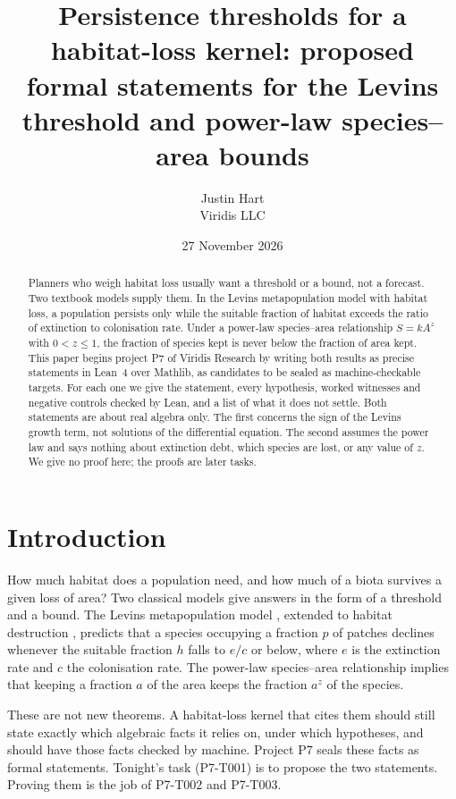 \documentclass[11pt]{article}
\title{Persistence thresholds for a habitat-loss kernel: proposed formal statements for the Levins
threshold and power-law species--area bounds}
\author{Justin Hart\\Viridis LLC}
\date{27 November 2026}
\begin{document}
\maketitle

\begin{abstract}
Planners who weigh habitat loss usually want a threshold or a bound, not a forecast. Two textbook
models supply them. In the Levins metapopulation model with habitat loss, a population persists
only while the suitable fraction of habitat exceeds the ratio of extinction to colonisation rate.
Under a power-law species--area relationship $S=kA^z$ with $0<z\le1$, the fraction of species kept
is never below the fraction of area kept. This paper begins project P7 of Viridis Research by
writing both results as precise statements in Lean~4 over Mathlib, as candidates to be sealed as
machine-checkable targets. For each one we give the statement, every hypothesis, worked witnesses
and negative controls checked by Lean, and a list of what it does not settle. Both statements are
about real algebra only. The first concerns the sign of the Levins growth term, not solutions of
the differential equation. The second assumes the power law and says nothing about extinction
debt, which species are lost, or any value of $z$. We give no proof here; the proofs are later
tasks.
\end{abstract}

\section{Introduction}
How much habitat does a population need, and how much of a biota survives a given loss of area?
Two classical models give answers in the form of a threshold and a bound. The Levins
metapopulation model \citep{Levins1969}, extended to habitat destruction
\citep{Lande1987,NeeMay1992}, predicts that a species occupying a fraction $p$ of patches declines
whenever the suitable fraction $h$ falls to $e/c$ or below, where $e$ is the extinction rate and
$c$ the colonisation rate. The power-law species--area relationship \citep{Arrhenius1921} implies
that keeping a fraction $a$ of the area keeps the fraction $a^z$ of the species.

These are not new theorems. A habitat-loss kernel that cites them should still state exactly
which algebraic facts it relies on, under which hypotheses, and should have those facts checked
by machine. Project P7 seals these facts as formal statements. Tonight's task (P7-T001) is to
propose the two statements. Proving them is the job of P7-T002 and P7-T003.
\end{document}
